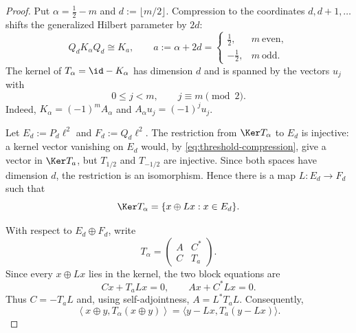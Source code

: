 \begin{proof}
Put $\alpha=\frac12-m$ and $d:=\lfloor m/2\rfloor$.  Compression to the
coordinates $d,d+1,\ldots$ shifts the generalized Hilbert parameter by $2d$:
\begin{equation}\label{eq:threshold-compression}
 Q_dK_\alpha Q_d\cong K_a,
 \qquad
 a:=\alpha+2d=
 \begin{cases}
  \frac12,&m\ \text{even},\\
  -\frac12,&m\ \text{odd}.
 \end{cases}
\end{equation}
The kernel of $T_\alpha=\id-K_\alpha$ has dimension $d$ and is spanned by the
vectors $u_j$ with
\begin{equation}\label{eq:critical-J}
 0\le j<m,
 \qquad
 j\equiv m\pmod2.
\end{equation}
Indeed, $K_\alpha=(-1)^mA_\alpha$ and
$A_\alpha u_j=(-1)^ju_j$.

Let $E_d:=P_d\ell^2$ and $F_d:=Q_d\ell^2$.  The restriction from
$\Ker T_\alpha$ to $E_d$ is injective: a kernel vector vanishing on $E_d$
would, by \eqref{eq:threshold-compression}, give a vector in $\Ker T_a$, but
$T_{1/2}$ and $T_{-1/2}$ are injective.  Since both spaces have dimension $d$,
the restriction is an isomorphism.  Hence there is a map
$L:E_d\to F_d$ such that
\begin{equation}\label{eq:kernel-graph}
 \Ker T_\alpha=\{x\oplus Lx:x\in E_d\}.
\end{equation}

With respect to $E_d\oplus F_d$, write
\begin{equation}\label{eq:threshold-block-operator}
 T_\alpha=
 \begin{pmatrix}A&C^*\\ C&T_a\end{pmatrix}.
\end{equation}
Since every $x\oplus Lx$ lies in the kernel, the two block equations are
\[
 Cx+T_aLx=0,
 \qquad
 Ax+C^*Lx=0.
\]
Thus $C=-T_aL$ and, using self-adjointness, $A=L^*T_aL$.  Consequently,
\begin{equation}\label{eq:threshold-square-completion}
 \left\langle x\oplus y,T_\alpha(x\oplus y)\right\rangle
 =\langle y-Lx,T_a(y-Lx)\rangle.
\end{equation}


\end{proof}
